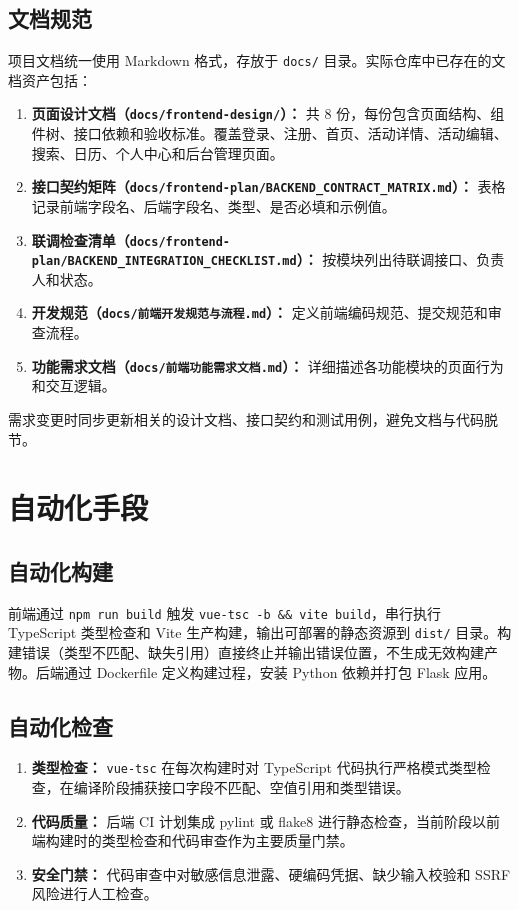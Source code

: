 \documentclass[12pt,a4paper]{ctexart}
\begin{document}
\subsection{文档规范}
项目文档统一使用 Markdown 格式，存放于 \texttt{docs/} 目录。实际仓库中已存在的文档资产包括：
\begin{enumerate}
\item \textbf{页面设计文档（\texttt{docs/frontend-design/}）：} 共 8 份，每份包含页面结构、组件树、接口依赖和验收标准。覆盖登录、注册、首页、活动详情、活动编辑、搜索、日历、个人中心和后台管理页面。
\item \textbf{接口契约矩阵（\texttt{docs/frontend-plan/BACKEND\_CONTRACT\_MATRIX.md}）：} 表格记录前端字段名、后端字段名、类型、是否必填和示例值。
\item \textbf{联调检查清单（\texttt{docs/frontend-plan/BACKEND\_INTEGRATION\_CHECKLIST.md}）：} 按模块列出待联调接口、负责人和状态。
\item \textbf{开发规范（\texttt{docs/前端开发规范与流程.md}）：} 定义前端编码规范、提交规范和审查流程。
\item \textbf{功能需求文档（\texttt{docs/前端功能需求文档.md}）：} 详细描述各功能模块的页面行为和交互逻辑。
\end{enumerate}
需求变更时同步更新相关的设计文档、接口契约和测试用例，避免文档与代码脱节。

\section{自动化手段}
\subsection{自动化构建}
前端通过 \texttt{npm run build} 触发 \texttt{vue-tsc -b \&\& vite build}，串行执行 TypeScript 类型检查和 Vite 生产构建，输出可部署的静态资源到 \texttt{dist/} 目录。构建错误（类型不匹配、缺失引用）直接终止并输出错误位置，不生成无效构建产物。后端通过 Dockerfile 定义构建过程，安装 Python 依赖并打包 Flask 应用。

\subsection{自动化检查}
\begin{enumerate}
\item \textbf{类型检查：} \texttt{vue-tsc} 在每次构建时对 TypeScript 代码执行严格模式类型检查，在编译阶段捕获接口字段不匹配、空值引用和类型错误。
\item \textbf{代码质量：} 后端 CI 计划集成 pylint 或 flake8 进行静态检查，当前阶段以前端构建时的类型检查和代码审查作为主要质量门禁。
\item \textbf{安全门禁：} 代码审查中对敏感信息泄露、硬编码凭据、缺少输入校验和 SSRF 风险进行人工检查。
\end{enumerate}
\end{document}
